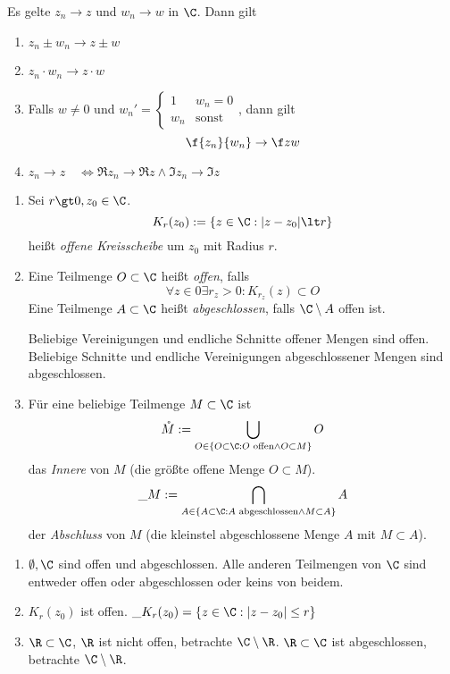 \documentclass[a4paper,10pt]{scrartcl}
\begin{document}
\begin{st}
	\label{st:1.6}
	Es gelte $z_n\to z$ und $w_n \to w$ in $\C$.
	Dann gilt
	\begin{enumerate}
		\item $z_n \pm w_n \to z \pm w$ 
		\item $z_n\cdot w_n \to z\cdot w$
		\item
			Falls $w\neq 0$ und $w_n' = \begin{cases} 1 & w_n=0 \\ w_n & \text{sonst}\end{cases}$, dann gilt
			\[
				\f {z_n}{w_n} \to \f zw
			\]
		\item $z_n\to z \quad\iff \Re z_n \to \Re z \land  \Im z_n \to \Im z$

	\end{enumerate}
\end{st}

\begin{df}
	\label{df:1.7}
	\begin{enumerate}
		\item 
			Sei $r\gt 0, z_0\in \C$.
			\[
				K_r(z_0) := \{z\in \C : |z-z_0| \lt r\}
			\]
			heißt \emph{offene Kreisscheibe} um $z_0$ mit Radius $r$.
		\item
			Eine Teilmenge $O \subset \C$ heißt \emph{offen}, falls
			\[
				\forall z\in 0 \exists r_z \gt 0 : K_{r_z}(z) \subset O
			\]
			Eine Teilmenge $A \subset \C$ heißt \emph{abgeschlossen}, falls $\C\setminus A$ offen ist.

			Beliebige Vereinigungen und endliche Schnitte offener Mengen sind offen.
			Beliebige Schnitte und endliche Vereinigungen abgeschlossener Mengen sind abgeschlossen.
		\item
			Für eine beliebige Teilmenge $M\subset \C$ ist
			\[
				\mathring M := \bigcup_{O\in \{O\subset \C: O \text{ offen} \land O \subset M\}} O
			\]
			das \emph{Innere} von $M$ (die größte offene Menge $O\subset M$).
			\[
				\_M := \bigcap_{A\in \{A\subset \C: A \text{ abgeschlossen} \land M \subset A\}} A
			\]
			der \emph{Abschluss} von $M$ (die kleinstel abgeschlossene Menge $A$ mit $M\subset A$).
	\end{enumerate}
\end{df}

\begin{ex}
	\label{ex:1.8}
	\begin{enumerate}
		\item 
			$\emptyset, \C$ sind offen und abgeschlossen. 
			Alle anderen Teilmengen von $\C$ sind entweder offen oder abgeschlossen oder keins von beidem.
		\item
			$K_r(z_0)$ ist offen. $\_{K_r(z_0)}=\{z\in \C : |z -z_0| \le r\}$
		\item
			$\R\subset \C$, $\R$ ist nicht offen, betrachte $\C\setminus \R$.
			$\R\subset \C$ ist abgeschlossen, betrachte $\C\setminus \R$.			
	\end{enumerate}
\end{ex}
\end{document}
